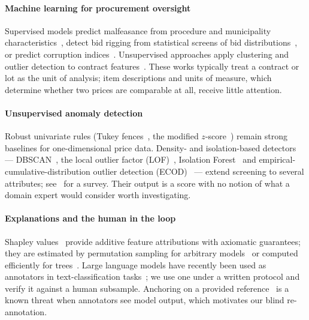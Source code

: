 \documentclass[conference]{IEEEtran}
\begin{document}
\paragraph{Machine learning for procurement oversight} Supervised models predict malfeasance from
procedure and municipality characteristics~\cite{gallego2021preventing}, detect bid rigging from
statistical screens of bid distributions~\cite{huber2019screens,tas2024collusion}, or predict corruption
indices~\cite{rabuzin2019prediction}. Unsupervised approaches apply clustering and outlier detection to
contract features~\cite{niessen2020ocds,torresberru2021mining,herreros2025purchase}. These works typically
treat a contract or lot as the unit of analysis; item descriptions and units of measure, which determine
whether two prices are comparable at all, receive little attention.

\paragraph{Unsupervised anomaly detection} Robust univariate rules (Tukey fences~\cite{tukey1977eda},
the modified $z$-score~\cite{iglewicz1993outliers}) remain strong baselines for one-dimensional price data.
Density- and isolation-based detectors --- DBSCAN~\cite{ester1996dbscan}, the local outlier factor
(LOF)~\cite{breunig2000lof}, Isolation Forest~\cite{liu2008iforest} and empirical-cumulative-distribution
outlier detection (ECOD)~\cite{li2023ecod} --- extend screening to several attributes;
see~\cite{chandola2009survey} for a survey. Their output is a score with no notion of what a domain
expert would consider worth investigating.

\paragraph{Explanations and the human in the loop} Shapley values~\cite{shapley1953value} provide
additive feature attributions with axiomatic guarantees; they are estimated by permutation sampling
for arbitrary models~\cite{strumbelj2014explaining} or computed efficiently for trees~\cite{lundberg2017shap,lundberg2020trees}.
Large language models have recently been used as annotators in text-classification tasks~\cite{gilardi2023chatgpt};
we use one under a written protocol and verify it against a human subsample. Anchoring on a provided
reference~\cite{tversky1974judgment} is a known threat when annotators see model output, which motivates
our blind re-annotation.
\end{document}
